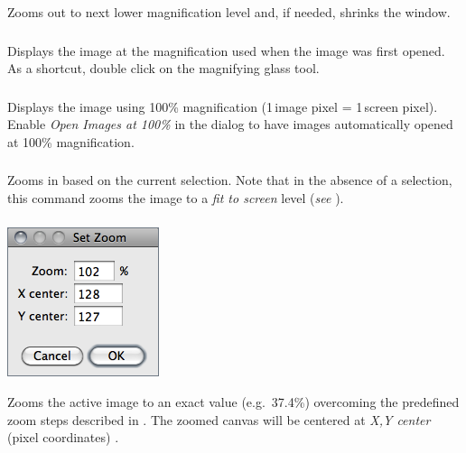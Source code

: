 Zooms out to next lower magnification level and, if needed, shrinks
the window. 


\subsubsection{\protect{}\label{sub:Original-Scale-[4]}}

Displays the image at the magnification used when the image was first
opened. As a shortcut, double click on the magnifying glass tool.


\subsubsection{\protect{}\label{sub:View-100=000025-[5]}}

Displays the image using 100\% magnification (1\,image pixel = 1\,screen
pixel). Enable \emph{Open Images at 100\%} in the 
dialog to have images automatically opened at 100\% magnification. 


\subsubsection{\protect{}\label{sub:ZoomToSelection}}

Zooms in based on the current selection. Note that in the absence
of a selection, this command zooms the image to a \emph{fit to screen}
level (\emph{see} ). 


\subsubsection[\protect\userinterface{Set\ldots{}}]{\protect{}\label{sub:Set-Zoom...}}

\begin{minipage}[c][1\totalheight][t]{0.26\columnwidth}%
\includegraphics[scale=0.55]{images/SetZoom}%
\end{minipage}%
\begin{minipage}[c][1\totalheight][t]{0.74\columnwidth}%
Zooms the active image to an exact value (e.g.\ 37.4\%) overcoming
the predefined zoom steps described in .
The zoomed canvas will be centered at \emph{X,Y center} (pixel coordinates)
\cite{C-SetZoom}.%
\end{minipage}



